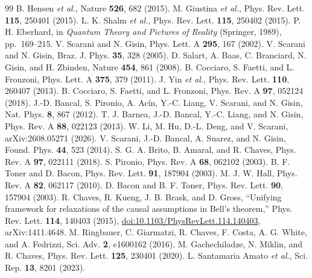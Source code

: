 \documentclass[10pt,twocolumn]{article}
\begin{document}
\begin{thebibliography}{99}
 B. Hensen \emph{et al.}, Nature \textbf{526}, 682 (2015).
 M. Giustina \emph{et al.}, Phys. Rev. Lett. \textbf{115}, 250401 (2015).
 L. K. Shalm \emph{et al.}, Phys. Rev. Lett. \textbf{115}, 250402 (2015).
 P. H. Eberhard, in \emph{Quantum Theory and Pictures of Reality} (Springer, 1989), pp.\ 169--215.
 V. Scarani and N. Gisin, Phys. Lett. A \textbf{295}, 167 (2002).
 V. Scarani and N. Gisin, Braz. J. Phys. \textbf{35}, 328 (2005).
 D. Salart, A. Baas, C. Branciard, N. Gisin, and H. Zbinden, Nature \textbf{454}, 861 (2008).
 B. Cocciaro, S. Faetti, and L. Fronzoni, Phys. Lett. A \textbf{375}, 379 (2011).
 J. Yin \emph{et al.}, Phys. Rev. Lett. \textbf{110}, 260407 (2013).
 B. Cocciaro, S. Faetti, and L. Fronzoni, Phys. Rev. A \textbf{97}, 052124 (2018).
 J.-D. Bancal, S. Pironio, A. Ac\'in, Y.-C. Liang, V. Scarani, and N. Gisin, Nat. Phys. \textbf{8}, 867 (2012).
 T. J. Barnea, J.-D. Bancal, Y.-C. Liang, and N. Gisin, Phys. Rev. A \textbf{88}, 022123 (2013).
 W. Li, M. Hu, D.-L. Deng, and V. Scarani, arXiv:2608.05271 (2026).
 V. Scarani, J.-D. Bancal, A. Suarez, and N. Gisin, Found. Phys. \textbf{44}, 523 (2014).
 S. G. A. Brito, B. Amaral, and R. Chaves, Phys. Rev. A \textbf{97}, 022111 (2018).
 S. Pironio, Phys. Rev. A \textbf{68}, 062102 (2003).
 B. F. Toner and D. Bacon, Phys. Rev. Lett. \textbf{91}, 187904 (2003).
 M. J. W. Hall, Phys. Rev. A \textbf{82}, 062117 (2010).
 D. Bacon and B. F. Toner, Phys. Rev. Lett. \textbf{90}, 157904 (2003).
 R. Chaves, R. Kueng, J. B. Brask, and D. Gross, ``Unifying framework for relaxations of the causal assumptions in Bell's theorem,'' Phys. Rev. Lett. \textbf{114}, 140403 (2015), \href{https://doi.org/10.1103/PhysRevLett.114.140403}{doi:10.1103/PhysRevLett.114.140403}, arXiv:1411.4648.
 M. Ringbauer, C. Giarmatzi, R. Chaves, F. Costa, A. G. White, and A. Fedrizzi, Sci. Adv. \textbf{2}, e1600162 (2016).
 M. Gachechiladze, N. Miklin, and R. Chaves, Phys. Rev. Lett. \textbf{125}, 230401 (2020).
 L. Santamaria Amato \emph{et al.}, Sci. Rep. \textbf{13}, 8201 (2023).

\end{thebibliography}
\end{document}
